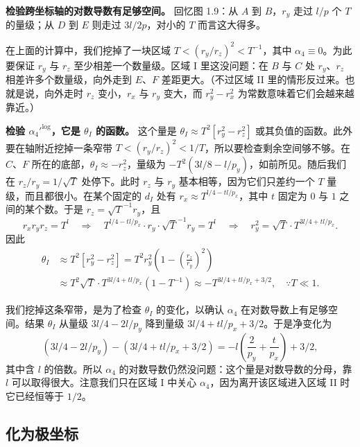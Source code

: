 \medskip
\noindent\textbf{检验跨坐标轴的对数导数有足够空间。} 回忆图 1.9：从 $A$ 到 $B$，$r_y$ 走过 $l/p$ 个 $T$ 的量级；从 $D$ 到 $E$ 则走过 $3l/2p$，对小的 $T$ 而言这大得多。

在上面的计算中，我们挖掉了一块区域 $T<(r_y/r_z)^2<T^{-1}$，其中 $\alpha_4\equiv0$。为此要保证 $r_y$ 与 $r_z$ 至少相差一个数量级。区域 I 里这没问题：在 $B$ 与 $C$ 处 $r_y$、$r_z$ 相差许多个数量级，向外走到 $E$、$F$ 差距更大。（不过区域 II 里的情形反过来。也就是说，向外走时 $r_z$ 变小，$r_x$ 与 $r_y$ 变大，而 $r_y^2-r_x^2$ 为常数意味着它们会越来越靠近。）

\medskip
\noindent\textbf{检验 ${\alpha_4'}^{\log}$，它是 $\theta_I$ 的函数。} 这个量是 $\theta_I\approx T^2[r_y^2-r_z^2]$ 或其负值的函数。此外要在轴附近挖掉一条窄带 $T<(r_y/r_z)^2<1/T$，所以要检查剩余空间够不够。在 $C$、$F$ 所在的底部，$\theta_I\approx-r_z^2$，量级为 $-T^2(3l/8-l/p_y)$，如前所见。随后我们在 $r_z/r_y=1/\sqrt{T}$ 处停下。此时 $r_z$ 与 $r_y$ 基本相等，因为它们只差约一个 $T$ 量级，而且都很小。在某个固定的 $d_I$ 处有 $r_x\approx T^{l/4-tl/p_x}$，其中 $t$ 固定为 $0$ 与 $1$ 之间的某个数。于是 $r_z=\sqrt{T}^{-1}r_y$，且
\[
r_xr_yr_z=T^l\quad\Longrightarrow\quad T^{l/4-tl/p_x}\cdot r_y\cdot\sqrt{T}^{-1}r_y=T^l
\quad\Longrightarrow\quad r_y^2=\sqrt{T}\cdot T^{3l/4+tl/p_x}.
\]
因此
\[
\begin{aligned}
\theta_I&\approx T^2[r_y^2-r_z^2]
=T^2r_y^2\left(1-\left(\frac{r_z}{r_y}\right)^2\right)\\
&\approx T^2\sqrt{T}\cdot T^{3l/4+tl/p_x}(1-T^{-1})
\approx -T^{3l/4+tl/p_x+3/2},\quad\because T\ll1.
\end{aligned}
\]

我们挖掉这条窄带，是为了检查 $\theta_I$ 的变化，以确认 $\alpha_4$ 在对数导数上有足够空间。结果 $\theta_I$ 从量级 $3l/4-2l/p_y$ 降到量级 $3l/4+tl/p_x+3/2$。于是净变化为
\[
(3l/4-2l/p_y)-(3l/4+tl/p_x+3/2)=-l\left(\frac{2}{p_y}+\frac{t}{p_x}\right)+3/2,
\]
其中含 $l$ 的倍数。所以 $\alpha_4$ 的对数导数仍然没问题：这个量是对数导数的分母，靠 $l$ 可以取得很大。注意我们只在区域 I 中关心 $\alpha_4$，因为离开该区域进入区域 II 时它已经恒等于 $1/2$。

\subsection{化为极坐标}

